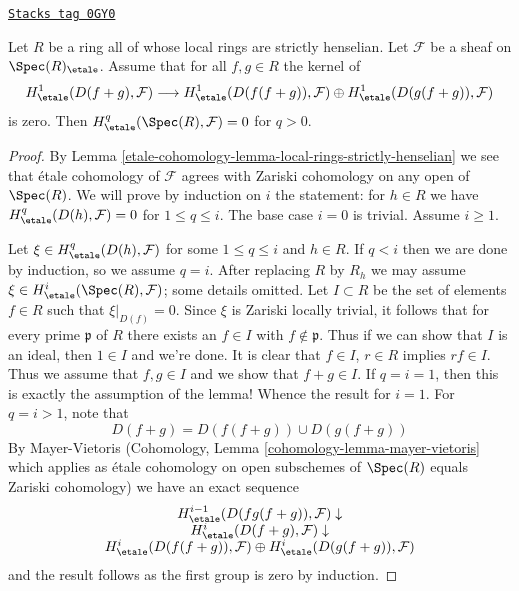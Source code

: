 \begin{lemma}
\label{etale-cohomology-lemma-gabber-criterion}
\href{https://stacks.math.columbia.edu/tag/0GY0}{\texttt{Stacks tag 0GY0}}

Let $R$ be a ring all of whose local rings are strictly henselian.
Let $\mathcal{F}$ be a sheaf on $\Spec(R)_\etale$.
Assume that for all $f, g \in R$ the kernel of
$$
H^1_\etale(D(f + g), \mathcal{F})
\longrightarrow
H^1_\etale(D(f(f + g)), \mathcal{F}) \oplus
H^1_\etale(D(g(f + g)), \mathcal{F})
$$
is zero. Then $H^q_\etale(\Spec(R), \mathcal{F}) = 0$ for $q > 0$.
\end{lemma}

\begin{proof}
By Lemma \ref{etale-cohomology-lemma-local-rings-strictly-henselian} we see that
\'etale cohomology of $\mathcal{F}$ agrees with Zariski cohomology
on any open of $\Spec(R)$. We will prove by induction on $i$ the
statement: for $h \in R$ we have $H^q_\etale(D(h), \mathcal{F}) = 0$
for $1 \leq q \leq i$. The base case $i = 0$ is trivial. Assume $i \geq 1$.

\medskip\noindent
Let $\xi \in H^q_\etale(D(h), \mathcal{F})$ for some $1 \leq q \leq i$
and $h \in R$. If $q < i$ then we are done by induction, so we assume $q = i$.
After replacing $R$ by $R_h$ we may assume
$\xi \in H^i_\etale(\Spec(R), \mathcal{F})$; some details omitted.
Let $I \subset R$ be the set of elements $f \in R$ such that
$\xi|_{D(f)} = 0$. Since $\xi$ is Zariski locally trivial, it follows
that for every prime $\mathfrak p$ of $R$ there exists an $f \in I$
with $f \not \in \mathfrak p$. Thus if we can show that $I$ is an
ideal, then $1 \in I$ and we're done. It is clear that
$f \in I$, $r \in R$ implies $rf \in I$. Thus we assume that $f, g \in I$
and we show that $f + g \in I$. If $q = i = 1$, then this is exactly the
assumption of the lemma! Whence the result for $i = 1$. For
$q = i > 1$, note that
$$
D(f + g) = D(f(f + g)) \cup D(g(f + g))
$$
By Mayer-Vietoris (Cohomology, Lemma \ref{cohomology-lemma-mayer-vietoris}
which applies as \'etale cohomology on open subschemes of $\Spec(R)$ equals
Zariski cohomology) we have an exact sequence
$$
\begin{array}{c}H^{i - 1}_\etale(D(fg(f + g)), \mathcal{F}) \downarrow \\ H^i_\etale(D(f + g), \mathcal{F}) \downarrow \\ H^i_\etale(D(f(f + g)), \mathcal{F}) \oplus
H^i_\etale(D(g(f + g)), \mathcal{F})\end{array}
$$
and the result follows as the first group is zero by induction.
\end{proof}

